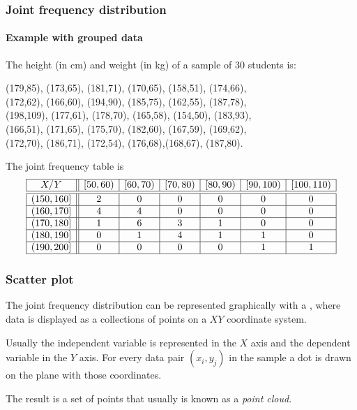 \begin{frame}
\frametitle{Joint frequency distribution}
\framesubtitle{Example with grouped data}
The height (in cm) and weight (in kg) of a sample of 30 students is:
\begin{center}
(179,85), (173,65), (181,71), (170,65), (158,51), (174,66),\\
(172,62), (166,60), (194,90), (185,75), (162,55), (187,78),\\
(198,109), (177,61), (178,70), (165,58), (154,50), (183,93),\\
(166,51), (171,65), (175,70), (182,60), (167,59), (169,62),\\
(172,70), (186,71), (172,54), (176,68),(168,67), (187,80).
\end{center}

The joint frequency table is 
\[
\begin{array}{|c||c|c|c|c|c|c|}
\hline
  X/Y & [50,60) & [60,70) & [70,80) & [80,90) & [90,100) & [100,110) \\
  \hline\hline
  (150,160] & 2 & 0 & 0 & 0 & 0 & 0 \\
  \hline
  (160,170] & 4 & 4 & 0 & 0 & 0 & 0 \\
  \hline
  (170,180] & 1 & 6 & 3 & 1 & 0 & 0 \\
  \hline
  (180,190] & 0 & 1 & 4 & 1 & 1 & 0 \\
  \hline
  (190,200] & 0 & 0 & 0 & 0 & 1 & 1 \\
  \hline
\end{array}
\]
\end{frame}


\begin{frame}
\frametitle{Scatter plot}
The joint frequency distribution can be represented graphically with a , where data is displayed
as a collections of points on a $XY$ coordinate system.

Usually the independent variable is represented in the $X$ axis and the dependent variable in the $Y$ axis.
For every data pair $(x_i,y_j)$ in the sample a dot is drawn on the plane with those coordinates.  
\begin{center}
\resizebox*{!}{0.45\textheight}{}
\end{center}

The result is a set of points that usually is known as a \emph{point cloud}.


\end{frame}


